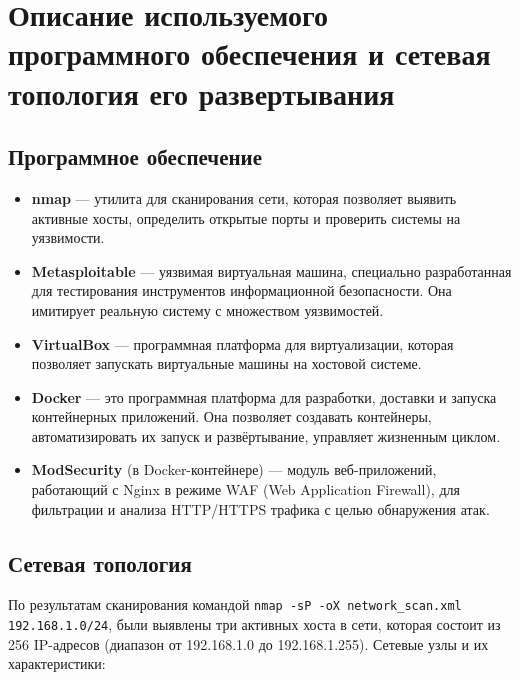 \section{Описание используемого программного обеспечения
	и сетевая топология его развертывания}

\subsection{Программное обеспечение}

\begin{itemize}
	\item \textbf{nmap} --- утилита для сканирования сети,
		которая позволяет выявить активные хосты,
		определить открытые порты и проверить системы на уязвимости.
	\item \textbf{Metasploitable} --- уязвимая виртуальная машина,
		специально разработанная
		для тестирования инструментов информационной безопасности.
		Она имитирует реальную систему с множеством уязвимостей.
	\item \textbf{VirtualBox} --- программная платформа для виртуализации,
		которая позволяет запускать виртуальные машины на хостовой системе.
	\item \textbf{Docker} --- это программная платформа для разработки,
		доставки и запуска контейнерных приложений.
		Она позволяет создавать контейнеры,
		автоматизировать их запуск и развёртывание,
		управляет жизненным циклом.
	\item \textbf{ModSecurity} (в Docker-контейнере) --- модуль веб-приложений,
		работающий с Nginx в режиме WAF (Web Application Firewall),
		для фильтрации и анализа HTTP/HTTPS трафика с целью обнаружения атак.
\end{itemize}

\subsection{Сетевая топология}

По результатам сканирования командой
\verb|nmap -sP -oX network_scan.xml 192.168.1.0/24|,
были выявлены три активных хоста в сети,
которая состоит из 256 IP-адресов
(диапазон от 192.168.1.0 до 192.168.1.255).
Сетевые узлы и их характеристики:

